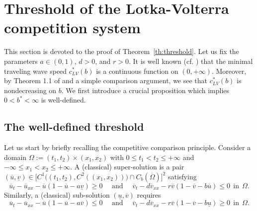 \documentclass[11pt,a4paper]{article}
\numberwithin{equation}{section}
\numberwithin{figure}{section}
\begin{document}


\section{Threshold of the Lotka-Volterra competition system}\label{sec:threshold-system}

This section is devoted to the proof of Theorem~\ref{th:threshold}. Let us fix the parameters $a\in(0,1)$, $d>0$, and $r>0$.
It is well known (cf. \cite[Lemma 5.6]{Kan-on1997}) that the minimal traveling wave speed $c_{LV}^{*}(b)$ is a continuous function on $(0,+\infty)$.
Moreover, by Theorem 1.1 of \cite{Wu Xiao Zhou} and a simple comparison argument, we see that $c_{LV}^{*}(b)$ is nondecreasing on $b$.
We first introduce a crucial proposition which implies $0<b^*<\infty$ is well-defined.






\subsection{The well-defined threshold}\label{sec:prop3.1}

\noindent

Let us start by briefly recalling the competitive comparison principle.
Consider a domain $
\Omega:=(t_1,t_2)\times(x_1,x_2)$ with  $0\le t_1<t_2\le + \infty$ and $-\infty\le x_1<x_2\le+\infty$. A (classical) super-solution is a pair  $(\overline{u},\underline{v})\in \Big[C^1\Big((t_1,t_2),C^2((x_1,x_2))\Big)\cap C_b\left(\overline \Omega\right)\Big]^2$
satisfying
\begin{equation*}
\overline u_t-\overline u_{xx}-\overline u(1-\overline u-a\underline v)\ge 0\quad \text{ and } \quad \overline v_t-d\overline v_{xx}-r\overline v(1-\overline v-b\overline u)\le 0\ \ \text{in}\ \ \Omega.
\end{equation*}
Similarly, a (classical) sub-solution $(\underline u, \overline v)$ requires  
\begin{equation*}
\overline u_t-\overline u_{xx}-\overline u(1-\overline u-a\overline v)\le 0\quad \text{ and } \quad \overline v_t-d\overline v_{xx}-r\overline v(1-\overline v-b\underline u)\ge 0\ \ \text{in}\ \ \Omega.
\end{equation*}
\end{document}
